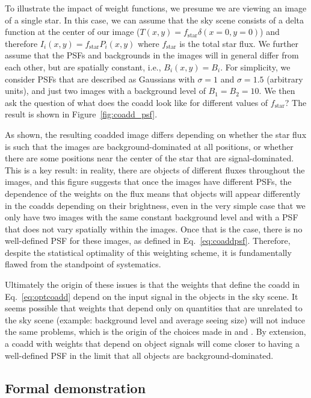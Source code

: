 \documentclass[modern]{style_and_logos/lsstdescnote}
\begin{document}
To illustrate the impact of weight functions, we presume we are viewing an image of a single star.  In this case, we can assume that the sky scene consists of a delta function at the center of our image ($T(x,y)=f_\text{star}\delta(x=0,y=0)$) and therefore $I_i(x,y)=f_\text{star}P_i(x,y)$ where $f_\text{star}$ is the total star flux.  We further assume that the PSFs and backgrounds in the images will in general differ from each other, but are spatially constant, i.e., $B_i(x,y)=B_i$.  For simplicity, we consider PSFs that are described as Gaussians with $\sigma=1$ and $\sigma=1.5$ (arbitrary units), and just two images with a background level of $B_1=B_2=10$.  We then ask the question of what does the coadd look like for different values of $f_\text{star}$?  The result is shown in Figure~\ref{fig:coadd_psf}.

As shown, the resulting coadded image differs depending on whether the star flux is such that the images are background-dominated at all positions, or whether there are some positions near the center of the star that are signal-dominated.  This is a key result: in reality, there are objects of different fluxes throughout the images, and this figure suggests that once the images have different PSFs, the dependence of the weights on the flux means that objects will appear differently in the coadds depending on their brightness, even in the very simple case that we only have two images with the same constant background level and with a PSF that does not vary spatially within the images.  Once that is the case, there is no well-defined PSF for these images, as defined in Eq.~\eqref{eq:coaddpsf}.  Therefore, despite the statistical optimality of this weighting scheme, it is fundamentally flawed from the standpoint of systematics.

Ultimately the origin of these issues is that the weights that define the coadd in Eq.~\eqref{eq:optcoadd} depend on the input signal in the objects in the sky scene.  It seems possible that weights that depend only on quantities that are unrelated to the sky scene (example: background level and average seeing size) will not induce the same problems, which is the origin of the choices made in \citet{2014ApJ...794..120A} and \citet{2017ApJ...836..187Z}.  By extension, a coadd with weights that depend on object signals will come closer to having a well-defined PSF in the limit that all objects are background-dominated.

 \subsection{Formal demonstration}\label{subsec:formal}
\end{document}
